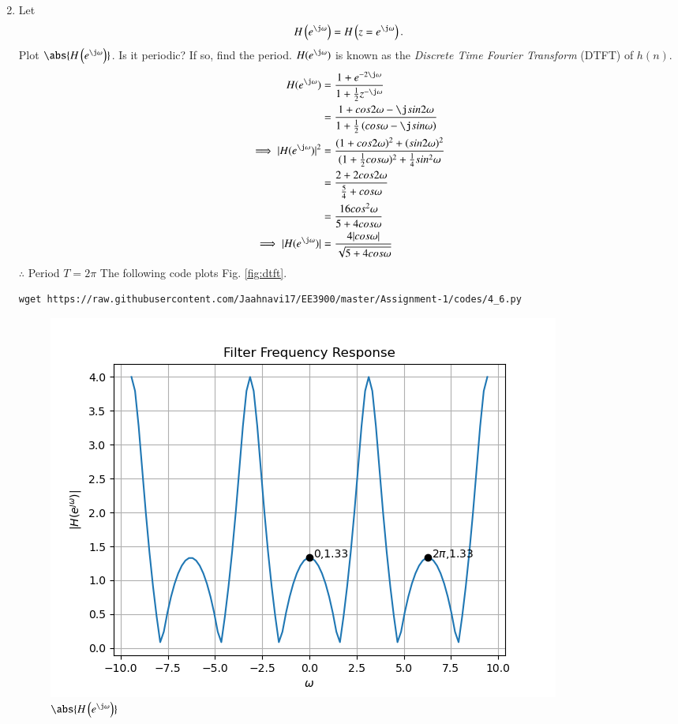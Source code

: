 \documentclass[journal,12pt,twocolumn]{IEEEtran}
\renewcommand\thesection{\arabic{section}}
\begin{document}
\begin{enumerate}[label=\thesection.\arabic*]
\begin{align}
\end{align}
\item 
Let
\begin{equation}
H\brak{e^{\j \omega}} = H\brak{z = e^{\j \omega}}.
\end{equation}
Plot $\abs{H\brak{e^{\j \omega}}}$.  Is it periodic? If so, find the period. $H(e^{\j \omega})$ is
known as the {\em Discrete Time Fourier Transform} (DTFT) of $h(n)$.\\
\solution 
\begin{align}
H(e^{\j\omega}) &= \frac{1 + e^{-2\j\omega}}{1 + \frac{1}{2}z^{-\j\omega}}\\
&= \frac{1+cos2\omega-\j sin2\omega}{1+\frac{1}{2}\brak{cos\omega-\j sin\omega}}\\
\implies |H(e^{\j\omega})|^2&= \frac{(1+cos2\omega)^2+(sin2\omega)^2}{(1+\frac{1}{2}cos\omega)^2+\frac{1}{4}sin^2\omega}\\
&= \frac{2+2cos2\omega}{\frac{5}{4}+cos\omega}\\
&= \frac{16cos^2\omega}{5+4cos\omega}\\
\implies |H(e^{\j\omega})| &= \frac{4|cos\omega|}{\sqrt{5+4cos\omega}}
\end{align}
$\therefore$ Period  $ T= 2\pi $
The following code plots Fig. \ref{fig:dtft}.
\begin{lstlisting}
wget https://raw.githubusercontent.com/Jaahnavi17/EE3900/master/Assignment-1/codes/4_6.py
\end{lstlisting}
\begin{figure}[!ht]
\centering
\includegraphics[width=\columnwidth]{figures/Figure_2.png}
\caption{$\abs{H\brak{e^{\j\omega}}}$}

\end{figure}
\end{enumerate}
\end{document}
